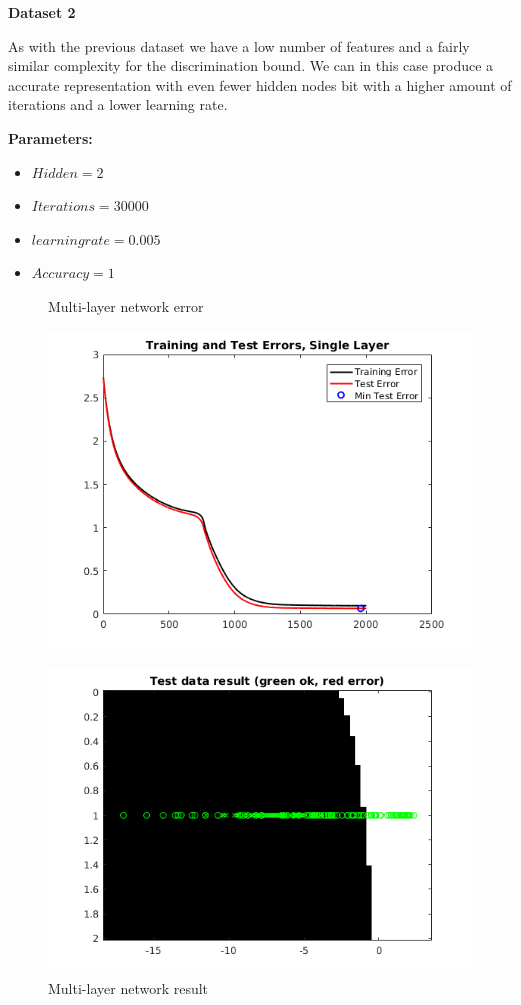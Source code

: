 \documentclass[a4paper,12pt]{article}
\begin{document}
\noindent \textbf{Dataset 2}

As with the previous dataset we have a low number of features and a fairly similar complexity for the discrimination bound. We can in this case produce a accurate representation with even fewer hidden nodes bit with a higher amount of iterations and a lower learning rate.

\textbf{Parameters:}
\begin{itemize}
\item $Hidden = 2$
\item $Iterations = 30000$
\item $learning rate = 0.005$
\item $Accuracy = 1$
\end{itemize}

\begin{figure}[H]
\centering
  \begin{minipage}[]{0.49\textwidth}
  \caption{Multi-layer network error}\label{fig:singlemulti_2_error}
  \includegraphics[width=\textwidth]{figures/multi_2_error.png}
  \end{minipage}
  \begin{minipage}[]{0.49\textwidth}
  \caption{Multi-layer network result}\label{fig:multi_2_test}
  \includegraphics[width=\textwidth]{figures/multi_2_test.png}
  \end{minipage}
\end{figure}
\end{document}
